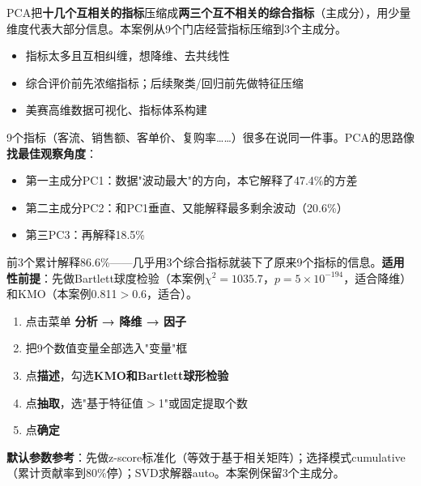 
\begin{algointro}
PCA把\textbf{十几个互相关的指标}压缩成\textbf{两三个互不相关的综合指标}（主成分），用少量维度代表大部分信息。本案例从9个门店经营指标压缩到3个主成分。
\end{algointro}

\begin{algoscene}
\begin{itemize}
    \item 指标太多且互相纠缠，想降维、去共线性
    \item 综合评价前先浓缩指标；后续聚类/回归前先做特征压缩
    \item 美赛高维数据可视化、指标体系构建
\end{itemize}
\end{algoscene}

\begin{algoprinciple}
9个指标（客流、销售额、客单价、复购率……）很多在说同一件事。PCA的思路像\textbf{找最佳观察角度}：
\begin{itemize}
    \item 第一主成分PC1：数据"波动最大"的方向，本它解释了47.4\%的方差
    \item 第二主成分PC2：和PC1垂直、又能解释最多剩余波动（20.6\%）
    \item 第三PC3：再解释18.5\%
\end{itemize}

前3个累计解释86.6\%——几乎用3个综合指标就装下了原来9个指标的信息。\textbf{适用性前提}：先做Bartlett球度检验（本案例$\chi^2=1035.7$，$p=5\times10^{-194}$，适合降维）和KMO（本案例0.811$>0.6$，适合）。
\end{algoprinciple}

\begin{algosposs}
\begin{enumerate}
    \item 点击菜单 \textbf{分析 → 降维 → 因子}
    \item 把9个数值变量全部选入"变量"框
    \item 点\textbf{描述}，勾选\textbf{KMO和Bartlett球形检验}
    \item 点\textbf{抽取}，选"基于特征值$>$1"或固定提取个数
    \item 点\textbf{确定}
\end{enumerate}

\textbf{默认参数参考}：先做z-score标准化（等效于基于相关矩阵）；选择模式cumulative（累计贡献率到80\%停）；SVD求解器auto。本案例保留3个主成分。
\end{algosposs}

